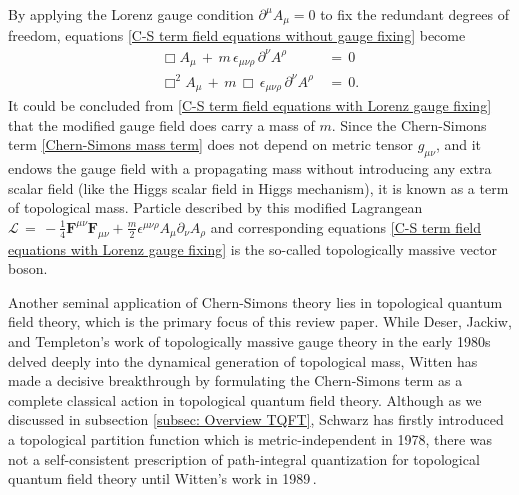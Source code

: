 By applying the Lorenz gauge condition $\partial^{\mu}A_{\mu}=0$ to fix the redundant degrees of freedom, equations \eqref{C-S term field equations without gauge fixing} become
\begin{equation}\label{C-S term field equations with Lorenz gauge fixing}
    \begin{split}
        \Box A_{\mu}\,+\,m\,\epsilon_{\mu\nu\rho}\,\partial^{\nu}A^{\rho}\,&=\,0 \\
        \Box^{2}A_{\mu}\,+\,m\,\Box\,\epsilon_{\mu\nu\rho}\,\partial^{\nu}A^{\rho}\,&=\,0.
    \end{split}
\end{equation}
It could be concluded from \eqref{C-S term field equations with Lorenz gauge fixing} that the modified gauge field does carry a mass of $m$. Since the Chern-Simons term \eqref{Chern-Simons mass term} does not depend on metric tensor $g_{\mu\nu}$, and it endows the gauge field with a propagating mass without introducing any extra scalar field (like the Higgs scalar field in Higgs mechanism), it is known as a term of topological mass. Particle described by this modified Lagrangean $\mathcal{L}\,=\,-\frac{1}{4}\mathbf{F}^{\mu\nu}\mathbf{F}_{\mu\nu}+\frac{m}{2}\epsilon^{\mu\nu\rho}A_{\mu}\partial_{\nu}A_{\rho}$ and corresponding equations \eqref{C-S term field equations with Lorenz gauge fixing} is the so-called topologically massive vector boson.
\par Another seminal application of Chern-Simons theory lies in topological quantum field theory, which is the primary focus of this review paper. While Deser, Jackiw, and Templeton's work of topologically massive gauge theory in the early 1980s delved deeply into the dynamical generation of topological mass, Witten has made a decisive breakthrough by formulating the Chern-Simons term as a complete classical action in topological quantum field theory.  Although as we discussed in subsection \ref{subsec: Overview TQFT}, Schwarz has firstly introduced a topological partition function which is metric-independent in 1978, there was not a self-consistent prescription of path-integral quantization for topological quantum field theory until Witten's work in 1989\,\cite{witten1989quantum}. 
